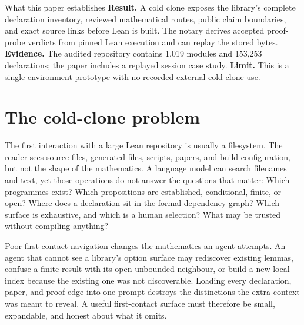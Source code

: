 \documentclass[11pt]{article}
\begin{document}
\begin{paperresult}{What this paper establishes}
\textbf{Result.} A cold clone exposes the library's complete declaration
inventory, reviewed mathematical routes, public claim boundaries, and exact
source links before Lean is built. The notary derives accepted proof-probe
verdicts from pinned Lean execution and can replay the stored bytes.
\textbf{Evidence.}
The audited repository contains 1,019 modules and 153,253 declarations; the
paper includes a replayed session case study.  \textbf{Limit.} This is a
single-environment prototype with no recorded external cold-clone use.
\end{paperresult}

\section{The cold-clone problem}\label{sec:problem}

The first interaction with a large Lean repository is usually a filesystem.
The reader sees source files, generated files, scripts, papers, and build
configuration, but not the shape of the mathematics. A language model can
search filenames and text, yet those operations do not answer the questions
that matter: Which programmes exist? Which propositions are established,
conditional, finite, or open? Where does a declaration sit in the formal
dependency graph? Which surface is exhaustive, and which is a human selection?
What may be trusted without compiling anything?

Poor first-contact navigation changes the mathematics an agent attempts. An
agent that cannot see a library's option surface may rediscover existing
lemmas, confuse a finite result with its open unbounded neighbour, or build a
new local index because the existing one was not discoverable. Loading every declaration,
paper, and proof edge into one prompt destroys the distinctions the extra
context was meant to reveal. A useful first-contact surface must therefore be
small, expandable, and honest about what it omits.
\end{document}
